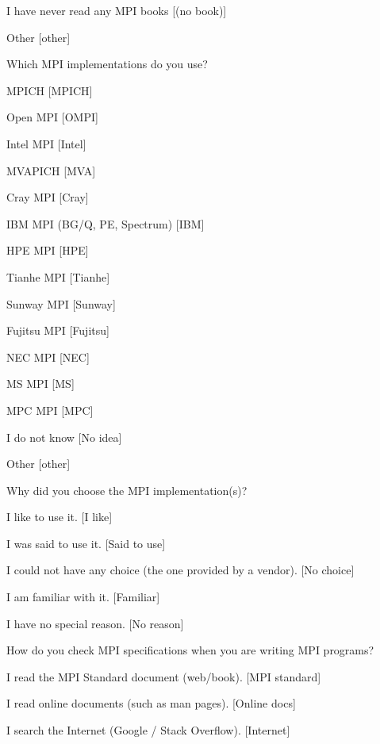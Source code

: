 \documentclass[conference,10pt,letterpaper]{IEEEtran}
\begin{document}
{{\begin{description}
\begin{inparaenum}[{\bf C}1)]
    \item I have never read any MPI books [(no book)]
    \item Other [other]
    \end{inparaenum}
  \item[Q12*:] Which MPI implementations do you use?
    \begin{inparaenum}[{\bf C}1)]
    \item MPICH [MPICH]
    \item Open MPI [OMPI]
    \item Intel MPI [Intel]
    \item MVAPICH [MVA]
    \item Cray MPI [Cray]
    \item IBM MPI (BG/Q, PE, Spectrum) [IBM]
    \item HPE MPI [HPE]
    \item Tianhe MPI [Tianhe]
    \item Sunway MPI [Sunway]
    \item Fujitsu MPI [Fujitsu]
    \item NEC MPI [NEC]
    \item MS MPI [MS]
    \item MPC MPI [MPC]
    \item I do not know [No idea]
    \item Other [other]
    \end{inparaenum}
  \item[Q13:] Why did you choose the MPI implementation(s)?
    \begin{inparaenum}[{\bf C}1)]
    \item I like to use it. [I like]
    \item I was said to use it. [Said to use]
    \item I could not have any choice (the one provided by a vendor). [No choice]
    \item I am familiar with it. [Familiar]
    \item I have no special reason. [No reason]
    \end{inparaenum}
  \item[Q14*:] How do you check MPI specifications when you are writing MPI programs?
    \begin{inparaenum}[{\bf C}1)]
    \item I read the MPI Standard document (web/book). [MPI standard]
    \item I read online documents (such as man pages). [Online docs]
    \item I search the Internet (Google / Stack Overflow). [Internet]

\end{inparaenum}
\end{description}}}
\end{document}
